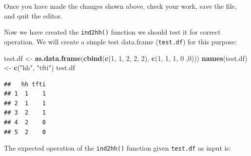 \documentclass[12pt,a4paper]{book}
\newenvironment{Shaded}{\begin{snugshade}}{\end{snugshade}}
\newcommand{\KeywordTok}[1]{\textcolor[rgb]{0.13,0.29,0.53}{\textbf{#1}}}
\newcommand{\DecValTok}[1]{\textcolor[rgb]{0.00,0.00,0.81}{#1}}
\newcommand{\StringTok}[1]{\textcolor[rgb]{0.31,0.60,0.02}{#1}}
\newcommand{\NormalTok}[1]{#1}
\theoremstyle{definition}
\theoremstyle{definition}
\theoremstyle{definition}
\theoremstyle{remark}
\begin{document}
Once you have made the changes shown above, check your work, save the
file, and quit the editor.

Now we have created the \texttt{ind2hh()} function we should test it for
correct operation. We will create a simple test data.frame
(\texttt{test.df}) for this purpose:

\begin{Shaded}
\begin{Highlighting}[]
\NormalTok{test.df <-}\StringTok{ }\KeywordTok{as.data.frame}\NormalTok{(}\KeywordTok{cbind}\NormalTok{(}\KeywordTok{c}\NormalTok{(}\DecValTok{1}\NormalTok{, }\DecValTok{1}\NormalTok{, }\DecValTok{2}\NormalTok{, }\DecValTok{2}\NormalTok{, }\DecValTok{2}\NormalTok{),  }\KeywordTok{c}\NormalTok{(}\DecValTok{1}\NormalTok{, }\DecValTok{1}\NormalTok{, }\DecValTok{1}\NormalTok{, }\DecValTok{0}\NormalTok{ ,}\DecValTok{0}\NormalTok{)))}
\KeywordTok{names}\NormalTok{(test.df) <-}\StringTok{ }\KeywordTok{c}\NormalTok{(}\StringTok{"hh"}\NormalTok{, }\StringTok{"tfti"}\NormalTok{)}
\NormalTok{test.df}
\end{Highlighting}
\end{Shaded}

\begin{verbatim}
##   hh tfti
## 1  1    1
## 2  1    1
## 3  2    1
## 4  2    0
## 5  2    0
\end{verbatim}

The expected operation of the \texttt{ind2hh()} function given
\texttt{test.df} as input is:
\end{document}
